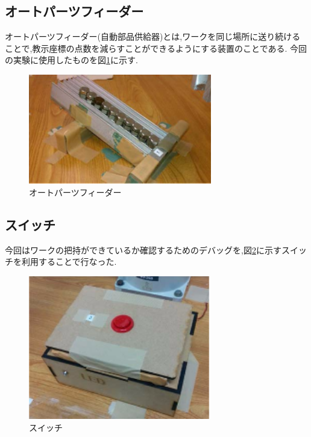 \documentclass[a4paper,11pt]{jsarticle}
\begin{document}
\subsection{オートパーツフィーダー}
オートパーツフィーダー(自動部品供給器)とは,ワークを同じ場所に送り続けることで,教示座標の点数を減らすことができるようにする装置のことである.
今回の実験に使用したものを図\ref{オートパーツフィーダー}に示す.
\begin{figure}[H]
  \begin{center}
    \includegraphics[width = 8cm]{画像/オートパーツフィーダー.png}
    \caption{オートパーツフィーダー}
    \label{オートパーツフィーダー}
  \end{center}
\end{figure}

\subsection{スイッチ}
今回はワークの把持ができているか確認するためのデバッグを,図\ref{スイッチ}に示すスイッチを利用することで行なった.
\begin{figure}[H]
  \begin{center}
    \includegraphics[width = 8cm]{画像/スイッチ.png}
    \caption{スイッチ}
    \label{スイッチ}
  \end{center}
\end{figure}
\end{document}
